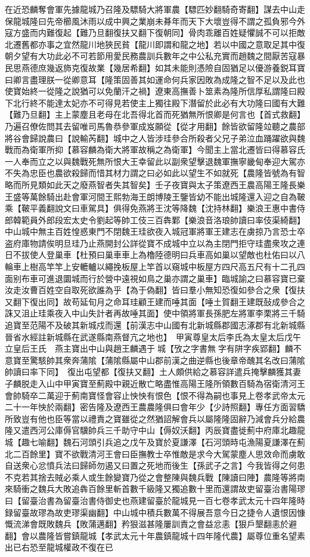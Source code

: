 在近恐麟奪會軍先據龍城乃召隆及驃騎大將軍農【驃匹妙翻騎奇寄翻】謀去中山走保龍城隆曰先帝櫛風沐雨以成中興之業崩未朞年而天下大壞豈得不謂之孤負邪今外寇方盛而内難復起【難乃旦翻復扶又翻下復朝同】骨肉乖離百姓疑懼誠不可以拒敵北遷舊都亦事之宜然龍川地狹民貧【龍川即謂和龍之地】若以中國之意取足其中復朝夕望有大功此必不可若節用愛民務農訓兵數年之中公私充實而趙魏之間厭苦寇暴民思燕德庶幾返斾克復故業【幾居希翻】如其未能則憑險自固猶足以優游養鋭耳寶曰卿言盡理朕一從卿意耳【隆策固善其如運命何兵家因敗為成隆之智不足以及此也使寶始終一從隆之說猶可以免蘭汗之禍】遼東高撫善卜筮素為隆所信厚私謂隆曰殿下北行終不能達太妃亦不可得見若使主上獨往殿下潛留於此必有大功隆曰國有大難【難乃旦翻】主上蒙塵且老母在北吾得北首而死猶無所恨卿是何言也【首式救翻】乃遍召僚佐問其去留唯司馬魯恭參軍成岌願從【從才用翻】餘皆欲留隆竝聽之農部將谷會歸說農曰【說輸芮翻】城中之人皆涉珪參合所殺者父兄子弟泣血踊躍欲與魏戰而為衛軍所抑【慕容麟為衛大將軍故稱之為衛軍】今聞主上當北遷皆曰得慕容氏一人奉而立之以與魏戰死無所恨大王幸留此以副衆望擊退魏軍撫寧畿甸奉迎大駕亦不失為忠臣也農欲殺歸而惜其材力謂之曰必如此以望生不如就死【農隆皆號為有智略而所見類如此天之廢燕智者失其智矣】壬子夜寶與太子策遼西王農高陽王隆長樂王盛等萬餘騎出赴會軍河間王熙勃海王朗博陵王鑒皆幼不能出城隆還入迎之自為鞁乘【鞁平義翻說文曰車駕具】俱得免燕將王沈等降魏【沈持林翻】樂浪王惠中書侍郎韓範員外郎段宏太史令劉起等帥工伎三百犇鄴【樂浪音洛琅帥讀曰率伎渠綺翻】中山城中無主百姓惶惑東門不閉魏王珪欲夜入城冠軍將軍王建志在虜掠乃言恐士卒盗府庫物請俟明旦珪乃止燕開封公詳從寶不成城中立以為主閉門拒守珪盡衆攻之連日不拔使人登巢車【杜預曰巢車車上為櫓陸德明曰兵車高如巢以望敵也杜佑曰以八輪車上樹高竿竿上安轆轤以繩挽板屋上竿首以窺城中板屋方四尺高五尺有十二孔四面别布車可進退圜城而行於營中遠視如鳥之巢亦謂之巢車】臨城諭之曰慕容寶已棄汝走汝曹百姓空自取死欲誰為乎【為于偽翻】皆曰羣小無知恐復如參合之衆【復扶又翻下復出同】故苟延旬月之命耳珪顧王建而唾其面【唾土賀翻王建既鼔成參合之誅又沮止珪乘夜入中山失計者再故唾其面】使中領將軍長孫肥左將軍李栗將三千騎追寶至范陽不及破其新城戍而還【前漢志中山國有北新城縣郡國志涿郡有北新城縣晉省水經註新城縣在武遂縣南燕督亢之地也】　甲寅尊皇太后李氏為太皇太后戊午立皇后王氏　燕主寶出中山與趙王麟遇于城【攷之字書無字有阱字疾郢翻】麟不意寶至驚駭帥其衆奔蒲隂【蒲隂縣屬中山郡前漢之曲逆縣也後章帝醜其名改曰蒲隂帥讀曰率下同】　復出屯望都【復扶又翻】土人頗供給之慕容詳遣兵掩擊麟獲其妻子麟脱走入山中甲寅寶至薊殿中親近散亡略盡惟高陽王隆所領數百騎為宿衛清河王會帥騎卒二萬迎于薊南寶怪會容止怏怏有恨色【恨不得為嗣也事見上卷孝武帝太元二十一年怏於兩翻】密告隆及遼西王農農隆俱曰會年少【少詩照翻】專任方面習驕所致豈有他也臣等當以禮責之寶雖從之然猶詔解會兵以屬隆隆固辭乃減會兵分給農隆又遣西河公庫傉官驥帥兵三千助守中山【傉奴沃翻】丙辰寶盡徙薊中府庫北趣龍城【趣七喻翻】魏石河頭引兵追之戊午及寶於夏謙澤【石河頭時屯漁陽夏謙澤在薊北二百餘里】寶不欲戰清河王會曰臣撫教士卒惟敵是求今大駕蒙塵人思效命而虜敢自送衆心忿憤兵法曰歸師勿遏又曰置之死地而後生【孫武子之言】今我皆得之何患不克若其捨去賊必乘人或生餘變寶乃從之會整陳與魏兵戰【陳讀曰陣】農隆等將南來騎衝之魏兵大敗追犇百餘里斬首數千級隆又獨追數十里而還謂故吏留臺治書陽璆曰【留臺治書為留臺治書侍御史也燕建留臺於龍城見一百七卷孝武太元十四年隆時録留臺故璆為故吏璆渠幽翻】中山城中積兵數萬不得展吾意今日之捷令人遺恨因慷慨流涕會既敗魏兵【敗蒲邁翻】矜狠滋甚隆屢訓責之會益忿恚【狠戶墾翻恚於避翻】會以農隆皆嘗鎮龍城【孝武太元十年農鎮龍城十四年隆代農】屬尊位重名望素出已右恐至龍城權政不復在已